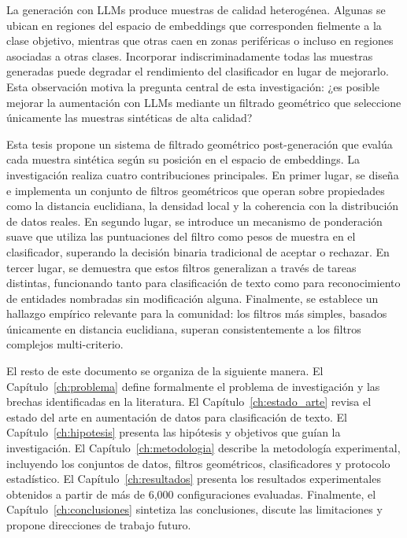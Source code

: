 La generación con LLMs produce muestras de calidad heterogénea. Algunas se ubican en regiones del espacio de embeddings que corresponden fielmente a la clase objetivo, mientras que otras caen en zonas periféricas o incluso en regiones asociadas a otras clases. Incorporar indiscriminadamente todas las muestras generadas puede degradar el rendimiento del clasificador en lugar de mejorarlo. Esta observación motiva la pregunta central de esta investigación: ¿es posible mejorar la aumentación con LLMs mediante un filtrado geométrico que seleccione únicamente las muestras sintéticas de alta calidad?

Esta tesis propone un sistema de filtrado geométrico post-generación que evalúa cada muestra sintética según su posición en el espacio de embeddings. La investigación realiza cuatro contribuciones principales. En primer lugar, se diseña e implementa un conjunto de filtros geométricos que operan sobre propiedades como la distancia euclidiana, la densidad local y la coherencia con la distribución de datos reales. En segundo lugar, se introduce un mecanismo de ponderación suave que utiliza las puntuaciones del filtro como pesos de muestra en el clasificador, superando la decisión binaria tradicional de aceptar o rechazar. En tercer lugar, se demuestra que estos filtros generalizan a través de tareas distintas, funcionando tanto para clasificación de texto como para reconocimiento de entidades nombradas sin modificación alguna. Finalmente, se establece un hallazgo empírico relevante para la comunidad: los filtros más simples, basados únicamente en distancia euclidiana, superan consistentemente a los filtros complejos multi-criterio.

El resto de este documento se organiza de la siguiente manera. El Capítulo~\ref{ch:problema} define formalmente el problema de investigación y las brechas identificadas en la literatura. El Capítulo~\ref{ch:estado_arte} revisa el estado del arte en aumentación de datos para clasificación de texto. El Capítulo~\ref{ch:hipotesis} presenta las hipótesis y objetivos que guían la investigación. El Capítulo~\ref{ch:metodologia} describe la metodología experimental, incluyendo los conjuntos de datos, filtros geométricos, clasificadores y protocolo estadístico. El Capítulo~\ref{ch:resultados} presenta los resultados experimentales obtenidos a partir de más de 6,000 configuraciones evaluadas. Finalmente, el Capítulo~\ref{ch:conclusiones} sintetiza las conclusiones, discute las limitaciones y propone direcciones de trabajo futuro.
